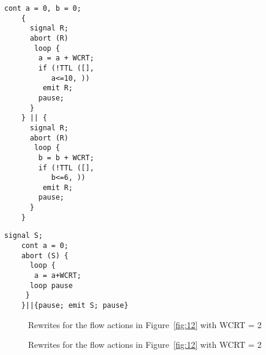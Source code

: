 \documentclass[10pt,journal,cspaper,compsoc]{IEEEtran}
\begin{document}
\newbox{\rfourth}
\begin{lrbox}{\rfourth}
  \begin{lstlisting}[mathescape,style=sysj,morekeywords={until,cont,
      wait_inbetween,signal,loop,abort,await,emit,present,trap,pause,exit,delay,suspend}]
    cont a = 0, b = 0; 
    {
      signal R;
      abort (R) 
       loop {
        a = a + WCRT;
        if (!TTL ([], 
           a<=10, )) 
         emit R;
        pause;
      }
    } || {
      signal R;
      abort (R) 
       loop {
        b = b + WCRT;
        if (!TTL ([], 
           b<=6, ))
         emit R;
        pause;
      }
    }
  \end{lstlisting}
\end{lrbox}

\newbox{\rfifth}
\begin{lrbox}{\rfifth}
  \begin{lstlisting}[mathescape,style=sysj,morekeywords={until,wait_inbetween,
      cont,signal,loop,abort,await,emit,present,trap,pause,exit,delay,suspend}]
    signal S;
    cont a = 0;
    abort (S) {
      loop {
       a = a+WCRT; 
      loop pause 
     }
    }||{pause; emit S; pause}
  \end{lstlisting}
\end{lrbox}

\begin{figure}[t!]
  \centering
  \hspace{10pt}

  \hspace{10pt}
  
  \caption{Rewrites for the flow actions in Figure~\ref{fig:12}
    with WCRT = 2}
  \label{fig:14}
\end{figure}

\begin{figure}[t!]
  \ContinuedFloat
  \centering
  \hspace{10pt}

  \hspace{10pt}

  \caption{Rewrites for the flow actions in Figure~\ref{fig:12}
    with WCRT = 2}
  \label{fig:14}
\end{figure}
\end{document}
